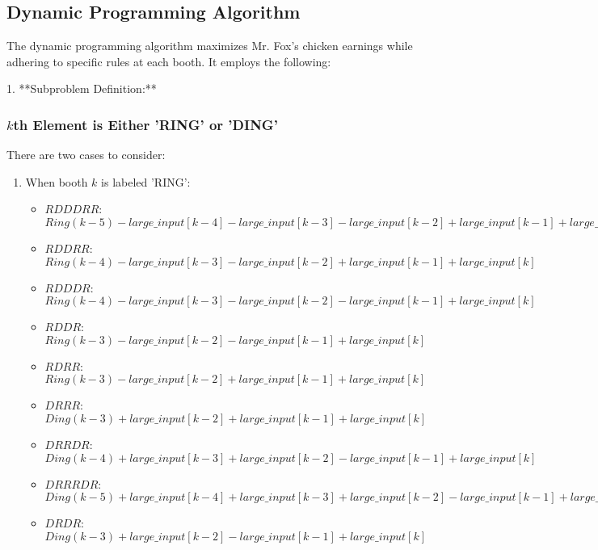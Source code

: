 \documentclass{article}
\begin{document}
\subsection{Dynamic Programming Algorithm}

The dynamic programming algorithm maximizes Mr. Fox's chicken earnings while adhering to specific rules at each booth. It employs the following:

1. **Subproblem Definition:**

    \subsubsection{\(k\)th Element is Either 'RING' or 'DING'}
There are two cases to consider:
\begin{enumerate}
    \item When booth \(k\) is labeled 'RING':
    \begin{itemize}
    \item \(RDDDRR\): \(Ring(k-5) - large\_input[k-4] - large\_input[k-3] - large\_input[k-2] + large\_input[k-1] + large\_input[k]\)
    \item \(RDDRR\): \(Ring(k-4) - large\_input[k-3] - large\_input[k-2] + large\_input[k-1] + large\_input[k]\)
    \item \(RDDDR\): \(Ring(k-4) - large\_input[k-3] - large\_input[k-2] - large\_input[k-1] + large\_input[k]\)
    \item \(RDDR\): \(Ring(k-3) - large\_input[k-2] - large\_input[k-1] + large\_input[k]\)
    \item \(RDRR\): \(Ring(k-3) - large\_input[k-2] + large\_input[k-1] + large\_input[k]\)
    \item \(DRRR\): \(Ding(k-3) + large\_input[k-2] + large\_input[k-1] + large\_input[k]\)
    \item \(DRRDR\): \(Ding(k-4) + large\_input[k-3] + large\_input[k-2] - large\_input[k-1] + large\_input[k]\)
    \item \(DRRRDR\): \(Ding(k-5) + large\_input[k-4] + large\_input[k-3] + large\_input[k-2] - large\_input[k-1] + large\_input[k]\)
    \item \(DRDR\): \(Ding(k-3) + large\_input[k-2] - large\_input[k-1] + large\_input[k]\)
\end{itemize}



\end{enumerate}
\end{document}
